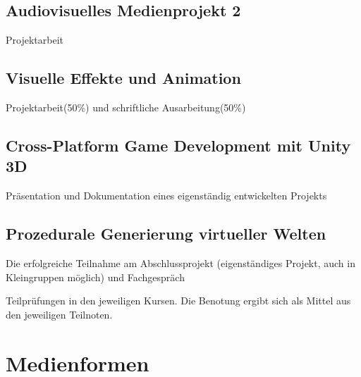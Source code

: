 \subsection*{Audiovisuelles Medienprojekt
2\label{/mi-2017/modulbeschreibungen-bachelor/BA_Vertiefung-Visual-Computing}}\label{audiovisuelles-medienprojekt-2pathlabelmi-2017modulbeschreibungen-bachelorbaux5fvertiefung-visual-computing-3}

Projektarbeit

\subsection*{Visuelle Effekte und
Animation\label{/mi-2017/modulbeschreibungen-bachelor/BA_Vertiefung-Visual-Computing}}\label{visuelle-effekte-und-animationpathlabelmi-2017modulbeschreibungen-bachelorbaux5fvertiefung-visual-computing-3}

Projektarbeit(50\%) und schriftliche Ausarbeitung(50\%)

\subsection*{Cross-Platform Game Development mit Unity
3D\label{/mi-2017/modulbeschreibungen-bachelor/BA_Vertiefung-Visual-Computing}}\label{cross-platform-game-development-mit-unity-3dpathlabelmi-2017modulbeschreibungen-bachelorbaux5fvertiefung-visual-computing-2}

Präsentation und Dokumentation eines eigenständig entwickelten Projekts

\subsection*{Prozedurale Generierung virtueller
Welten\label{/mi-2017/modulbeschreibungen-bachelor/BA_Vertiefung-Visual-Computing}}\label{prozedurale-generierung-virtueller-weltenpathlabelmi-2017modulbeschreibungen-bachelorbaux5fvertiefung-visual-computing-3}

Die erfolgreiche Teilnahme am Abschlussprojekt (eigenständiges Projekt,
auch in Kleingruppen möglich) und Fachgespräch

Teilprüfungen in den jeweiligen Kursen. Die Benotung ergibt sich als
Mittel aus den jeweiligen Teilnoten.

\section*{Medienformen\label{/mi-2017/modulbeschreibungen-bachelor/BA_Vertiefung-Visual-Computing}}\label{medienformenpathlabelmi-2017modulbeschreibungen-bachelorbaux5fvertiefung-visual-computing}

